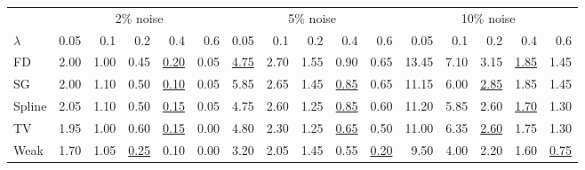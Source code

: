 \begin{tabular}{l|rrrrr|rrrrr|rrrrr}\toprule
 & \multicolumn{5}{c}{2\% noise} & \multicolumn{5}{c}{5\% noise} & \multicolumn{5}{c}{10\% noise} \\
$\lambda$ & 0.05 & 0.1 & 0.2 & 0.4 & 0.6 & 0.05 & 0.1 & 0.2 & 0.4 & 0.6 & 0.05 & 0.1 & 0.2 & 0.4 & 0.6 \\\midrule
FD & 2.00 & 1.00 & 0.45 & \colorbox{black!15}{\underline{0.20}} & 0.05 & \underline{4.75} & \colorbox{black!15}{2.70} & 1.55 & 0.90 & 0.65 & 13.45 & 7.10 & 3.15 & \underline{1.85} & \colorbox{black!15}{1.45} \\
SG & 2.00 & 1.10 & 0.50 & \colorbox{black!15}{\underline{0.10}} & 0.05 & 5.85 & 2.65 & 1.45 & \colorbox{black!15}{\underline{0.85}} & 0.65 & 11.15 & 6.00 & \colorbox{black!15}{\underline{2.85}} & 1.85 & 1.45 \\
Spline & 2.05 & 1.10 & 0.50 & \colorbox{black!15}{\underline{0.15}} & 0.05 & 4.75 & 2.60 & 1.25 & \colorbox{black!15}{\underline{0.85}} & 0.60 & 11.20 & 5.85 & 2.60 & \underline{1.70} & \colorbox{black!15}{1.30} \\
TV & 1.95 & 1.00 & 0.60 & \colorbox{black!15}{\underline{0.15}} & 0.00 & 4.80 & 2.30 & 1.25 & \colorbox{black!15}{\underline{0.65}} & 0.50 & 11.00 & 6.35 & \colorbox{black!15}{\underline{2.60}} & 1.75 & 1.30 \\
Weak & 1.70 & 1.05 & \underline{0.25} & 0.10 & \colorbox{black!15}{0.00} & 3.20 & 2.05 & 1.45 & 0.55 & \colorbox{black!15}{\underline{0.20}} & 9.50 & 4.00 & 2.20 & 1.60 & \colorbox{black!15}{\underline{0.75}} \\
\bottomrule\end{tabular}
